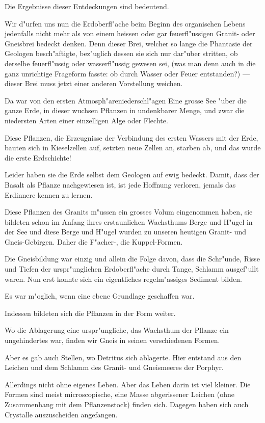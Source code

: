 \documentclass[a4paper, 11pt, oneside, german]{article}
\begin{document}
Die Ergebnisse dieser Entdeckungen sind bedeutend.

Wir d"urfen uns nun die Erdoberfl"ache beim Beginn des organischen Lebens jedenfalls nicht mehr als von einem heissen oder gar feuerfl"ussigen Granit- oder Gneisbrei bedeckt denken. Denn dieser Brei, welcher so lange die Phantasie der Geologen besch"aftigte, bez"uglich dessen sie sich nur dar"uber stritten, ob derselbe feuerfl"ussig oder wasserfl"ussig gewesen sei, (was man denn auch in die ganz unrichtige Frageform fasste: ob durch Wasser oder Feuer entstanden?) --- dieser Brei muss jetzt einer anderen Vorstellung weichen.

Da war von den ersten Atmosph"areniederschl"agen Eine grosse See "uber die ganze Erde, in dieser wuchsen Pflanzen in undenkbarer Menge, und zwar die niedersten Arten einer einzelligen Alge oder Flechte.

Diese Pflanzen, die Erzeugnisse der Verbindung des ersten Wassers mit der Erde, bauten sich in Kieselzellen auf, setzten neue Zellen an, starben ab, und das wurde die erste Erdschichte!

Leider haben sie die Erde selbst dem Geologen auf ewig bedeckt. Damit, dass der Basalt als Pflanze nachgewiesen ist, ist jede Hoffnung verloren, jemals das Erdinnere kennen zu lernen.

Diese Pflanzen des Granits m"ussen ein grosses Volum eingenommen haben, sie bildeten schon im Anfang ihres erstaunlichen Wachsthums Berge und H"ugel in der See und diese Berge und H"ugel wurden zu unseren heutigen Granit- und Gneis-Gebirgen. Daher die F"acher-, die Kuppel-Formen.

Die Gneisbildung war einzig und allein die Folge davon, dass die Schr"unde, Risse und Tiefen der urspr"unglichen Erdoberfl"ache durch Tange, Schlamm ausgef"ullt waren. Nun erst konnte sich ein eigentliches regelm"assiges Sediment bilden.

Es war m"oglich, wenn eine ebene Grundlage geschaffen war.

Indessen bildeten sich die Pflanzen in der Form weiter.

Wo die Ablagerung eine urspr"ungliche, das Wachsthum der Pflanze ein ungehindertes war, finden wir Gneis in seinen verschiedenen Formen.

Aber es gab auch Stellen, wo Detritus sich ablagerte. Hier entstand aus den Leichen und dem Schlamm des Granit- und Gneismeeres der Porphyr.

Allerdings nicht ohne eigenes Leben. Aber das Leben darin ist viel kleiner. Die Formen sind meist microscopische, eine Masse abgerissener Leichen (ohne Zusammenhang mit dem Pflanzenstock) finden sich. Dagegen haben sich auch Crystalle auszuscheiden angefangen.
\end{document}
